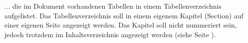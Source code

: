 
... die im Dokument vorhandenen Tabellen in einem Tabellenverzeichnis aufgelistet. Das Tabellenverzeichnis soll in einem eigenem Kapitel (Section) auf einer eigenen Seite angezeigt werden. Das Kapitel soll nicht nummeriert sein, jedoch trotzdem im Inhaltsverzeichnis angezeigt werden (siehe Seite \pageref{toc}).
